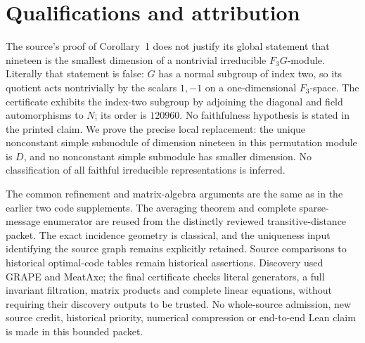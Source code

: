 \documentclass[11pt,a4paper]{article}
\begin{document}
\section{Qualifications and attribution}
The source's proof of Corollary~1 does not justify its global statement
that nineteen is the smallest dimension of a nontrivial irreducible
$F_3G$-module. Literally that statement is false: $G$ has a normal
subgroup of index two, so its quotient acts nontrivially by the scalars
$1,-1$ on a one-dimensional $F_3$-space. The certificate exhibits the
index-two subgroup by adjoining the diagonal and field automorphisms
to $N$; its order is $120960$. No faithfulness hypothesis is stated in
the printed claim. We prove the precise local replacement: the unique
nonconstant simple submodule of dimension nineteen in this permutation
module is $D$, and no nonconstant simple submodule has smaller dimension.
No classification of all faithful irreducible representations is inferred.

The common refinement and matrix-algebra arguments are the same as in
the earlier two code supplements. The averaging theorem and complete
sparse-message enumerator are reused from the distinctly reviewed
transitive-distance packet. The exact incidence geometry is classical,
and the uniqueness input identifying the source graph remains explicitly
retained. Source comparisons to historical optimal-code tables remain
historical assertions. Discovery used GRAPE and MeatAxe; the final
certificate checks literal generators, a full invariant filtration,
matrix products and complete linear equations, without requiring their
discovery outputs to be trusted. No whole-source admission, new source
credit, historical priority, numerical compression or end-to-end Lean
claim is made in this bounded packet.
\end{document}
